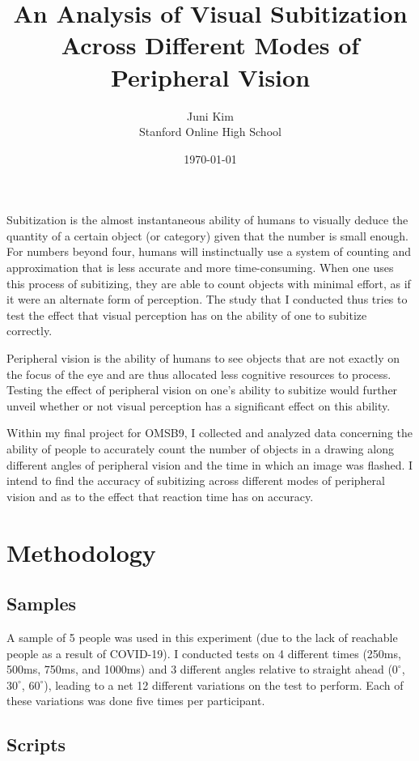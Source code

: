 \documentclass[12pt]{article}
\title{An Analysis of Visual Subitization Across Different Modes of Peripheral Vision}
\author{Juni Kim \\
Stanford Online High School}
\date{\today}
\begin{document}
 

\maketitle

Subitization is the almost instantaneous ability of humans to visually deduce
the quantity of a certain object (or category) given that the number is small
enough. For numbers beyond four, humans will instinctually use a system of
counting and approximation that is less accurate and more time-consuming. When
one uses this process of subitizing, they are able to count objects with
minimal effort, as if it were an alternate form of perception. The study that
I conducted thus tries to test the effect that visual perception has on the
ability of one to subitize correctly.

Peripheral vision is the ability of humans to see objects that are not exactly
on the focus of the eye and are thus allocated less cognitive resources to
process. Testing the effect of peripheral vision on one's ability to subitize
would further unveil whether or not visual perception has a significant effect
on this ability.

Within my final project for OMSB9, I collected and analyzed data concerning the
ability of people to accurately count the number of objects in a drawing along
different angles of peripheral vision and the time in which an image was
flashed. I intend to find the accuracy of subitizing across different modes of
peripheral vision and as to the effect that reaction time has on accuracy.

\section{Methodology}

\subsection{Samples}
A sample of 5 people was used in this experiment (due to the lack of reachable
people as a result of COVID-19). I conducted tests on 4 different times (250ms,
500ms, 750ms, and 1000ms) and 3 different angles relative to straight ahead
($0^{\circ}$, $30^{\circ}$, $60^{\circ}$), leading to a net 12 different
variations on the test to perform. Each of these variations was done five times
per participant.

\subsection{Scripts}
\end{document}
